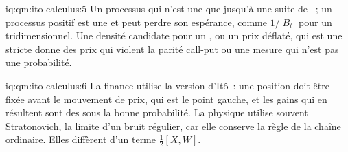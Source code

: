 \begin{solution}{iq:qm:ito-calculus:5}
Un processus qui n'est une  que jusqu'à une suite de ~; un processus positif est une
 et peut perdre son espérance, comme $1/|B_t|$ pour un  tridimensionnel.
Une densité candidate pour un , ou un prix déflaté, qui est une 
stricte donne des prix qui violent la parité call-put ou une mesure qui n'est pas une probabilité.
\end{solution}

\begin{solution}{iq:qm:ito-calculus:6}
La finance utilise la version d'Itô~: une position doit être fixée avant le mouvement de prix, qui est le point gauche, et
les gains qui en résultent sont des  sous la bonne probabilité. La physique utilise souvent Stratonovich,
la limite d'un bruit régulier, car elle conserve la règle de la chaîne ordinaire. Elles diffèrent d'un terme $\tfrac12[X,W]$.
\end{solution}
